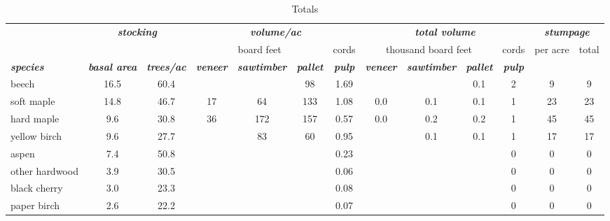 \documentclass[landscape]{article}
\begin{document}
\begin{table}[H]

\caption{\label{tab:unnamed-chunk-44}Totals}
\fontsize{10}{12}\selectfont
\begin{tabular}[t]{lcccccccccccc}
\toprule
\multicolumn{1}{c}{\em{\textbf{ }}} & \multicolumn{2}{c}{\em{\textbf{stocking}}} & \multicolumn{4}{c}{\em{\textbf{volume/ac }}} & \multicolumn{4}{c}{\em{\textbf{total volume}}} & \multicolumn{2}{c}{\em{\textbf{stumpage}}} \\
\cmidrule(l{3pt}r{3pt}){2-3} \cmidrule(l{3pt}r{3pt}){4-7} \cmidrule(l{3pt}r{3pt}){8-11} \cmidrule(l{3pt}r{3pt}){12-13}
\multicolumn{3}{c}{ } & \multicolumn{3}{c}{board feet} & \multicolumn{1}{c}{cords} & \multicolumn{3}{c}{thousand board feet} & \multicolumn{1}{c}{cords} & \multicolumn{1}{c}{per acre} & \multicolumn{1}{c}{total} \\
\cmidrule(l{3pt}r{3pt}){4-6} \cmidrule(l{3pt}r{3pt}){7-7} \cmidrule(l{3pt}r{3pt}){8-10} \cmidrule(l{3pt}r{3pt}){11-11} \cmidrule(l{3pt}r{3pt}){12-12} \cmidrule(l{3pt}r{3pt}){13-13}
\rowcolor[HTML]{DCDCDC}  \em{\textbf{species}} & \em{\textbf{basal area}} & \em{\textbf{trees/ac}} & \em{\textbf{veneer}} & \em{\textbf{sawtimber}} & \em{\textbf{pallet}} & \em{\textbf{pulp}} & \em{\textbf{veneer}} & \em{\textbf{sawtimber}} & \em{\textbf{pallet}} & \em{\textbf{pulp}} & \em{\textbf{ }} & \em{\textbf{ }}\\
\midrule
\rowcolor{gray!6}  beech & 16.5 & 60.4 &  &  & 98 & 1.69 &  &  & 0.1 & 2 & 9 & 9\\
 
soft maple & 14.8 & 46.7 & 17 & 64 & 133 & 1.08 & 0.0 & 0.1 & 0.1 & 1 & 23 & 23\\
 
\rowcolor{gray!6}  hard maple & 9.6 & 30.8 & 36 & 172 & 157 & 0.57 & 0.0 & 0.2 & 0.2 & 1 & 45 & 45\\
 
yellow birch & 9.6 & 27.7 &  & 83 & 60 & 0.95 &  & 0.1 & 0.1 & 1 & 17 & 17\\
 
\rowcolor{gray!6}  aspen & 7.4 & 50.8 &  &  &  & 0.23 &  &  &  & 0 & 0 & 0\\
 
other hardwood & 3.9 & 30.5 &  &  &  & 0.06 &  &  &  & 0 & 0 & 0\\
 
\rowcolor{gray!6}  black cherry & 3.0 & 23.3 &  &  &  & 0.08 &  &  &  & 0 & 0 & 0\\
 
paper birch & 2.6 & 22.2 &  &  &  & 0.07 &  &  &  & 0 & 0 & 0\\
 

\end{tabular}
\end{table}
\end{document}
